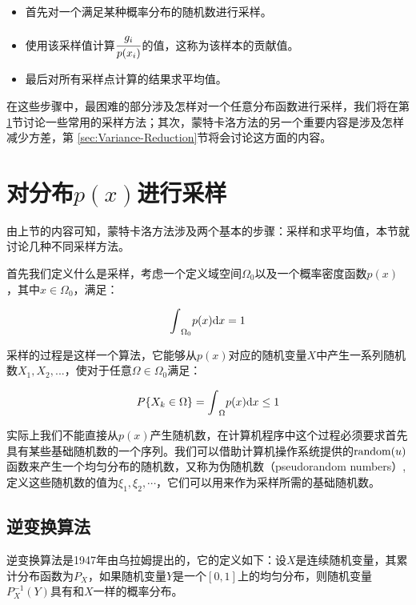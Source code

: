 \begin{itemize}
	\item 首先对一个满足某种概率分布的随机数进行采样。
	\item 使用该采样值计算$ \cfrac{g_i}{p(x_i)}$的值，这称为该样本的贡献值。
	\item 最后对所有采样点计算的结果求平均值。
\end{itemize}

在这些步骤中，最困难的部分涉及怎样对一个任意分布函数进行采样，我们将在第\ref{sec:Sampling-Random-Variables}节讨论一些常用的采样方法；其次，蒙特卡洛方法的另一个重要内容是涉及怎样减少方差，第 \ref{sec:Variance-Reduction}节将会讨论这方面的内容。





\section{对分布$p(x)$进行采样}\label{sec:Sampling-Random-Variables}
由上节的内容可知，蒙特卡洛方法涉及两个基本的步骤：采样和求平均值，本节就讨论几种不同采样方法。

首先我们定义什么是采样，考虑一个定义域空间$\Omega_0$以及一个概率密度函数$p(x)$，其中$x\in\Omega_0$，满足：

\begin{equation}
	{\rm \int}_{\Omega_0}p(x){\rm d}x=1
\end{equation}

采样的过程是这样一个算法，它能够从$p(x)$对应的随机变量$X$中产生一系列随机数$X_1,X_2,...$，使对于任意$\Omega\in\Omega_0$满足：

\begin{equation}
	P\{X_k\in\Omega\}={\rm \int}_{\Omega}p(x){\rm d}x\leq 1
\end{equation}

实际上我们不能直接从$p(x)$产生随机数，在计算机程序中这个过程必须要求首先具有某些基础随机数的一个序列。我们可以借助计算机操作系统提供的${\rm random}(u)$函数来产生一个均匀分布的随机数，又称为伪随机数（pseudorandom numbers）, 定义这些随机数的值为$\xi_1,\xi_2,\cdots$，它们可以用来作为采样所需的基础随机数。




\subsection{逆变换算法}\label{sec:mc-inversion-method}
逆变换算法是1947年由乌拉姆提出的，它的定义如下：设$X$是连续随机变量，其累计分布函数为$P_X$，如果随机变量$Y$是一个$[0,1]$上的均匀分布，则随机变量$P^{-1}_X(Y)$具有和$X$一样的概率分布。

